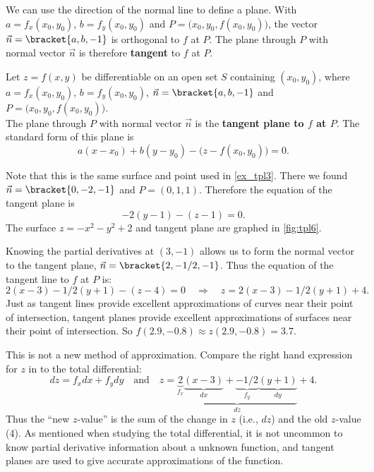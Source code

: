 We can use the direction of the normal line to define a plane. With $a=f_x(x_0,y_0)$, $b=f_y(x_0,y_0)$ and $P = \big(x_0,y_0,f(x_0,y_0)\big)$, the vector $\vec n=\bracket{a,b,-1}$ is orthogonal to $f$ at $P$. The plane through $P$ with normal vector $\vec n$ is therefore \textbf{tangent} to $f$ at $P$.

{Let $z=f(x,y)$ be differentiable on an open set $S$ containing $(x_0,y_0)$, where
$a = f_x(x_0,y_0)$, $b=f_y(x_0,y_0)$, $\vec n=\bracket{a,b,-1}$ and $P=\big(x_0,y_0,f(x_0,y_0)\big)$.\\

The plane through $P$ with normal vector $\vec n$ is the \textbf{tangent plane to $f$ at $P$}. The standard form of this plane is 
\[a(x-x_0) + b(y-y_0) - \big(z-f(x_0,y_0)\big) = 0.\]}

{Note that this is the same surface and point used in \autoref{ex_tpl3}.
%
%
There we found $\vec n =\bracket{0,-2,-1}$ and $P = (0,1,1)$. Therefore the equation of the tangent plane is
\[-2(y-1)-(z-1)=0.\]
The surface $z=-x^2-y^2+2$ and tangent plane are graphed in \autoref{fig:tpl6}.}

{Knowing the partial derivatives at $(3,-1)$ allows us to form the normal vector to the tangent plane, $\vec n =\bracket{2,-1/2,-1}$. Thus the equation of the tangent line to $f$ at $P$ is:
\begin{equation}
2(x-3)-1/2(y+1) - (z-4) = 0
\quad \Rightarrow \quad
z = 2(x-3)-1/2(y+1)+4.\label{eq:tpl7}
\end{equation}
Just as tangent lines provide excellent approximations of curves near their point of intersection, tangent planes provide excellent approximations of surfaces near their point of intersection. So $f(2.9,-0.8) \approx z(2.9,-0.8) = 3.7.$

This is not a new method of approximation. Compare the right hand expression for $z$ in  to the total differential:
\[dz = f_xdx + f_ydy \quad \text{and} \quad z = \underbrace{\underbrace{2}_{f_x}\underbrace{(x-3)}_{dx}
+\underbrace{-1/2}_{f_y}\underbrace{(y+1)}_{dy}}_{dz}+4.\]
Thus the ``new $z$-value'' is the sum of the change in $z$ (i.e., $dz$) and the old $z$-value (4). As mentioned when studying the total differential, it is not uncommon to know partial derivative information about a unknown function, and tangent planes are used to give accurate approximations of the function.}

